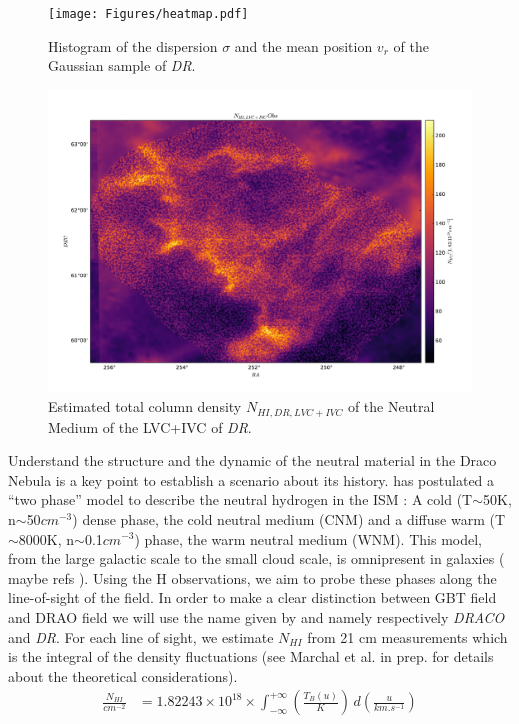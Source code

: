 \documentclass[traditabstract]{aa}
\begin{document}
\begin{figure}
   \texttt{[image: Figures/heatmap.pdf]}
   \caption{Histogram of the dispersion $\sigma$ and the mean position $v_{r}$ of the Gaussian sample of \textit{DR}.}
   \label{fig::heatmap}
\end{figure}

\begin{figure}[h!]
   \includegraphics[width=\linewidth]{Figures/NHI_obs_DRAO.pdf}
   \caption{Estimated total column density $N_{HI, DR, LVC+IVC}$ of the Neutral Medium of the LVC+IVC of \textit{DR}.}
   \label{fig::NHI_obs_DRAO}
\end{figure}

Understand the structure and the dynamic of the neutral material in the Draco Nebula is a key point to establish a scenario about
its history. \cite{field1969cosmic} has postulated a ``two phase'' model to describe the neutral hydrogen in the ISM : 
A cold (T$\sim$50K, n$\sim$50$cm^{-3}$) dense phase, the cold neutral medium (CNM) and a diffuse warm (T$\sim$8000K, 
n$\sim$0.1$cm^{-3}$) phase, the warm neutral medium (WNM). This model, from the large galactic scale to the 
small cloud scale, is omnipresent in galaxies (\color{red} maybe refs \color{black}).
Using the H observations, we aim to probe these phases along the line-of-sight of the field. In order to make a clear 
distinction between GBT field and DRAO field we will use the name given by \cite{Martin_2015} and \cite{Blagrave_2017} namely 
respectively \textit{DRACO} and \textit{DR}. For each line of sight, we estimate $N_{HI}$ from 21 cm measurements which is 
the integral of the density fluctuations (see Marchal et al. in prep. for details about the theoretical considerations). \\
\begin{align}
  \frac{N_{HI}}{cm^{-2}} &= 1.82243 \times 10^{18} \times \int_{-\infty}^{+\infty} \left( \frac{T_B(u)}{K} 
  \right) \, d\left( \frac{u}{km.s^{-1}}\right) 
  \label{eq::NHI}
\end{align}
\end{document}
